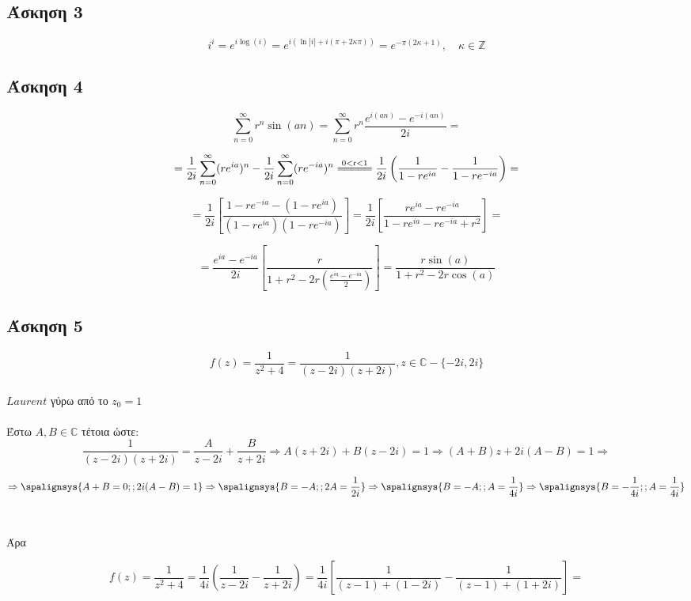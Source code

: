 \documentclass[12pt]{article}
\begin{document}
\newpage

 \subsection{Άσκηση 3}

$$ i^i=e^{i \log(i)}=e^{i (\ln|i| + i (\pi + 2\kappa \pi) )}=e^{-\pi(2\kappa+1)},\quad\kappa \in \mathbb{Z} $$

 \subsection{Άσκηση 4}
$$
\sum_{n=0}^{\infty} r^n \sin(a n)=\sum_{n=0}^{\infty} r^n \frac{e^{i (a n)}-e^{-i (a n)}}{2i}=$$

$$ =\frac{1}{2i}\sum_{n=0}^{\infty} (r e^ { i a })^n - \frac{1}{2i}\sum_{n=0}^{\infty}(r e^ { -i a })^n\overset{\mathrm{0<r<1}}{ =\joinrel=\joinrel=\joinrel=\joinrel=}\frac{1}{2i} \left ( \frac{1}{1-re^{ia}}-\frac{1}{1-re^{-ia}}\right)=$$

$$ = \frac{1}{2i} \left [ \frac{1-re^{-ia}-(1-re^{ia})}{(1-re^{ia})(1-re^{-ia})} \right] =\frac{1}{2i} \left [ \frac{re^{ia}-re^{-ia}}{1-re^{ia}-re^{-ia}+r^2} \right] = $$

$$ = \frac{e^{ia}-e^{-ia}}{2i} \left [ \frac{r}{1+r^2-2r\left( \frac {e^{ia}-e^{-ia}}{2}\right)} \right] =  \frac{r \sin(a)}{1+r^2-2r\cos(a)} $$

\newpage
 \subsection{Άσκηση 5}

$$ f(z)=\frac{1}{z^2+4}=\frac{1}{(z-2i)(z+2i)},z\in\mathbb{C}-\{-2i,2i\} $$ 
\\
$ Laurent $ γύρω από το $ z_0=1 $
\\ \\
Έστω $A,B\in \mathbb{C}$  τέτοια ώστε:
$$ \frac{1}{(z-2i)(z+2i)}= \frac{A}{z-2i}+\frac{B}{z+2i} \Rightarrow
A(z+2i)+B(z-2i)=1 \Rightarrow (A+B)z+2i(A-B)=1 \Rightarrow $$

\[
\Rightarrow
\spalignsys{A+B=0; ;2i(A-B)=1}
\Rightarrow
\spalignsys{B=-A; ;2A=\frac{1}{2i}}
\Rightarrow
\spalignsys{B=-A; ;A=\frac{1}{4i}}
\Rightarrow
\spalignsys{B=-\frac{1}{4i}; ;A=\frac{1}{4i}}
\]
\\ \\
Άρα

$$ f(z)=\frac{1}{z^2+4}= \frac{1}{4i}\left( \frac{1}{z-2i} - \frac{1}{z+2i} \right) = \frac{1}{4i}\left[ \frac{1}{(z-1)+(1-2i)} - \frac{1}{(z-1)+(1+2i)} \right] =$$
\end{document}
